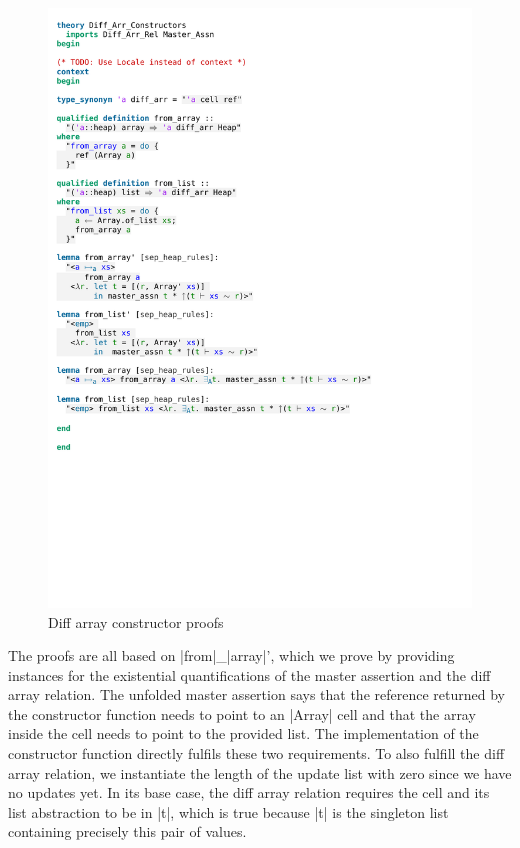 \begin{figure}[htpb]
    \includegraphics[trim={0 9,6cm 0 12,2cm}, clip, width=1.00\textwidth]{figures/Theory_Diff_Arr_Constructors.pdf}
    \caption[Diff array constructor proofs]{Diff array constructor proofs}
    \label{fig:diff_arr_constructor_proofs}
\end{figure}

\noindent The proofs are all based on |from|\_|array|', which we prove by providing instances for the existential quantifications of the master assertion and the diff array relation. The unfolded master assertion says that the reference returned by the constructor function needs to point to an |Array| cell and that the array inside the cell needs to point to the provided list. The implementation of the constructor function directly fulfils these two requirements. To also fulfill the diff array relation, we instantiate the length of the update list with zero since we have no updates yet. In its base case, the diff array relation requires the cell and its list abstraction to be in |t|, which is true because |t| is the singleton list containing precisely this pair of values.

